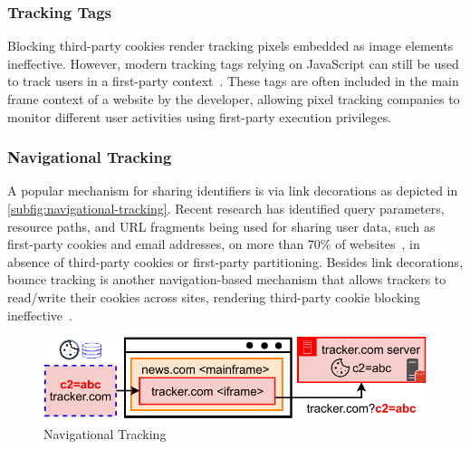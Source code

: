 \vspace{-1mm}
\subsubsection{Tracking Tags}
Blocking third-party cookies render tracking pixels embedded as image elements ineffective. 
%
However, modern tracking tags relying on JavaScript can still be used to track users in a first-party context~\cite{munirCookieGraphUnderstandingDetecting2023}. 
%
These tags are often included in the main frame context of a website by the developer, allowing pixel tracking companies to monitor different user activities using first-party execution privileges.


\vspace{-1mm}
\subsubsection{Navigational Tracking}
\label{sec:navigational-tracking}
A popular mechanism for sharing identifiers is via link decorations as depicted in \autoref{subfig:navigational-tracking}. 
%
Recent research has identified query parameters, resource paths, and URL fragments being used for sharing user data, such as first-party cookies and email addresses, on more than 70\% of websites~\cite{munirPURLSafeEffective2024}, in absence of third-party cookies or first-party partitioning. 
%
Besides link decorations, bounce tracking is another navigation-based mechanism that allows trackers to read/write their cookies across sites, rendering third-party cookie blocking ineffective~\cite{kellyBounceTrackingMitigations2022}. 


\begin{figure}[htbp]
    \vspace{-2mm}
    \centering
    \includegraphics[width=1\linewidth]{figures/tracking-mechanisms-navigational-tracking.pdf}
    \caption{Navigational Tracking}
    \label{subfig:navigational-tracking}
    \vspace{-2mm}
\end{figure}

